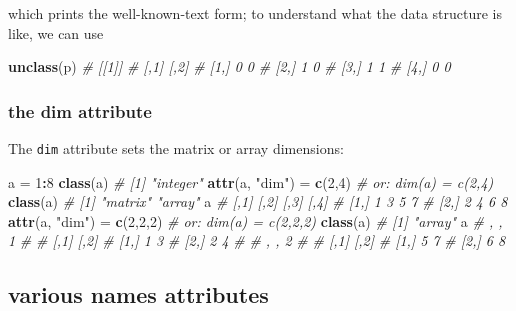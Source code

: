 \documentclass[]{book}
\newenvironment{Shaded}{\begin{snugshade}}{\end{snugshade}}
\newcommand{\CommentTok}[1]{\textcolor[rgb]{0.56,0.35,0.01}{\textit{#1}}}
\newcommand{\DecValTok}[1]{\textcolor[rgb]{0.00,0.00,0.81}{#1}}
\newcommand{\KeywordTok}[1]{\textcolor[rgb]{0.13,0.29,0.53}{\textbf{#1}}}
\newcommand{\NormalTok}[1]{#1}
\newcommand{\OperatorTok}[1]{\textcolor[rgb]{0.81,0.36,0.00}{\textbf{#1}}}
\newcommand{\StringTok}[1]{\textcolor[rgb]{0.31,0.60,0.02}{#1}}
\begin{document}
which prints the well-known-text form; to understand what the data structure is
like, we can use

\begin{Shaded}
\begin{Highlighting}[]
\KeywordTok{unclass}\NormalTok{(p)}
\CommentTok{# [[1]]}
\CommentTok{#      [,1] [,2]}
\CommentTok{# [1,]    0    0}
\CommentTok{# [2,]    1    0}
\CommentTok{# [3,]    1    1}
\CommentTok{# [4,]    0    0}
\end{Highlighting}
\end{Shaded}

\hypertarget{the-dim-attribute}{%
\subsubsection*{the dim attribute}\label{the-dim-attribute}}

The \texttt{dim} attribute sets the matrix or array dimensions:

\begin{Shaded}
\begin{Highlighting}[]
\NormalTok{a =}\StringTok{ }\DecValTok{1}\OperatorTok{:}\DecValTok{8}
\KeywordTok{class}\NormalTok{(a)}
\CommentTok{# [1] "integer"}
\KeywordTok{attr}\NormalTok{(a, }\StringTok{"dim"}\NormalTok{) =}\StringTok{ }\KeywordTok{c}\NormalTok{(}\DecValTok{2}\NormalTok{,}\DecValTok{4}\NormalTok{) }\CommentTok{# or: dim(a) = c(2,4)}
\KeywordTok{class}\NormalTok{(a)}
\CommentTok{# [1] "matrix" "array"}
\NormalTok{a}
\CommentTok{#      [,1] [,2] [,3] [,4]}
\CommentTok{# [1,]    1    3    5    7}
\CommentTok{# [2,]    2    4    6    8}
\KeywordTok{attr}\NormalTok{(a, }\StringTok{"dim"}\NormalTok{) =}\StringTok{ }\KeywordTok{c}\NormalTok{(}\DecValTok{2}\NormalTok{,}\DecValTok{2}\NormalTok{,}\DecValTok{2}\NormalTok{) }\CommentTok{# or: dim(a) = c(2,2,2)}
\KeywordTok{class}\NormalTok{(a)}
\CommentTok{# [1] "array"}
\NormalTok{a}
\CommentTok{# , , 1}
\CommentTok{# }
\CommentTok{#      [,1] [,2]}
\CommentTok{# [1,]    1    3}
\CommentTok{# [2,]    2    4}
\CommentTok{# }
\CommentTok{# , , 2}
\CommentTok{# }
\CommentTok{#      [,1] [,2]}
\CommentTok{# [1,]    5    7}
\CommentTok{# [2,]    6    8}
\end{Highlighting}
\end{Shaded}

\hypertarget{various-names-attributes}{%
\subsection*{various names attributes}\label{various-names-attributes}}
\end{document}
